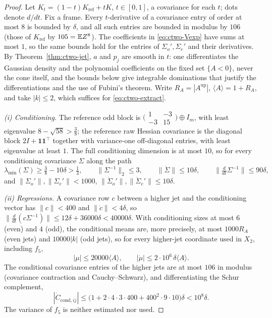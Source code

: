 \begin{proof}
Let $K_t=(1-t)K_{\mathrm{ref}}+tK$, $t\in[0,1]$, a covariance for each $t$; dots denote $d/dt$. Fix a frame. Every $t$-derivative of a covariance entry of order at most $8$ is bounded by $\delta$, and all such entries are bounded in modulus by $106$ (those of $K_{\mathrm{ref}}$ by $105=\mathbb E Z^8$). The coefficients in \eqref{eq:ctwo-Vexp} have sums at most $1$, so the same bounds hold for the entries of $\Sigma_o',\Sigma_e'$ and their derivatives. By Theorem~\ref{thm:ctwo-jet}, $a$ and $p_j$ are smooth in $t$: one differentiates the Gaussian density and the polynomial coefficients on the fixed set $\{A<0\}$, never the cone itself, and the bounds below give integrable dominations that justify the differentiations and the use of Fubini's theorem. Write $R_A=|A^{\mathrm{up}}|$, $\langle A\rangle=1+R_A$, and take $|k|\le2$, which suffices for \eqref{eq:ctwo-extract}.

\emph{(i) Conditioning.} The reference odd block is $\bigl(\begin{smallmatrix}1&-3\\-3&15\end{smallmatrix}\bigr)\oplus I_m$, with least eigenvalue $8-\sqrt{58}>\frac38$; the reference raw Hessian covariance is the diagonal block $2I+\mathbf 1\mathbf 1^{\top}$ together with variance-one off-diagonal entries, with least eigenvalue at least $1$. The full conditioning dimension is at most $10$, so for every conditioning covariance $\Sigma$ along the path
\begin{equation}\label{eq:ctwo-floor}
\lambda_{\min}(\Sigma)\ge\tfrac38-10\delta>\tfrac13,\qquad \|\Sigma^{-1}\|_2\le3,\qquad \|\dot\Sigma\|\le10\delta,\qquad \bigl\|\tfrac d{dt}\Sigma^{-1}\bigr\|\le90\delta,
\end{equation}
and $\|\Sigma_o'\|,\|\Sigma_e'\|<1000$, $\|\dot\Sigma_o'\|,\|\dot\Sigma_e'\|\le10\delta$.

\emph{(ii) Regressions.} A covariance row $c$ between a higher jet and the conditioning vector has $\|c\|<400$ and $\|\dot c\|<4\delta$, so $\|\frac d{dt}(c\Sigma^{-1})\|\le12\delta+36000\delta<40000\delta$. With conditioning sizes at most $6$ (even) and $4$ (odd), the conditional means are, more precisely, at most $1000R_A$ (even jets) and $10000|k|$ (odd jets), so for every higher-jet coordinate used in $X_2$, including $f_5$,
\begin{equation}\label{eq:ctwo-mean}
|\mu|\le20000\langle A\rangle,\qquad |\dot\mu|\le2\cdot10^6\,\delta\langle A\rangle .
\end{equation}
The conditional covariance entries of the higher jets are at most $106$ in modulus (covariance contraction and Cauchy--Schwarz), and differentiating the Schur complement,
\begin{equation}\label{eq:ctwo-schur}
|\dot C_{\mathrm{cond},ij}|\le\bigl(1+2\cdot4\cdot3\cdot400+400^2\cdot9\cdot10\bigr)\delta<10^8\delta .
\end{equation}
The variance of $f_5$ is neither estimated nor used.


\end{proof}
